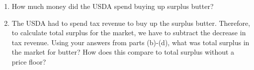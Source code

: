 \documentclass{article}
\begin{document}
\begin{enumerate}
\begin{enumerate}
	\item How much money did the USDA spend buying up surplus butter?
	
	\item The USDA had to spend tax revenue to buy up the surplus butter. Therefore, to calculate total surplus for the market, we have to subtract the decrease in tax revenue. Using your answers from parts (b)-(d), what was total surplus in the market for butter? How does this compare to total surplus without a price floor?
	
	\end{enumerate}

\end{enumerate}
\end{document}
